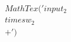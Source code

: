 \documentclass[preview]{standalone}
\begin{document}
\begin{align*}
MathTex('input _ 2  \\times  w _ 2 \\ +')
\end{align*}
\end{document}
